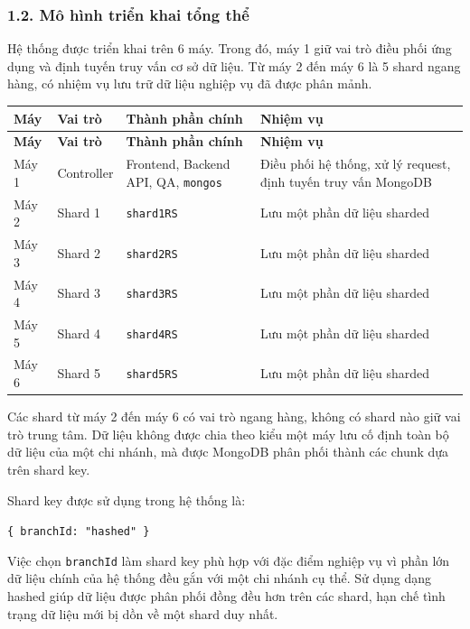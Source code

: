 \documentclass[12pt,a4paper]{article}
\begin{document}
\subsubsection*{1.2. Mô hình triển khai tổng thể}

Hệ thống được triển khai trên 6 máy. Trong đó, máy 1 giữ vai trò điều phối ứng dụng và định tuyến truy vấn cơ sở dữ liệu. Từ máy 2 đến máy 6 là 5 shard ngang hàng, có nhiệm vụ lưu trữ dữ liệu nghiệp vụ đã được phân mảnh.

\begin{center}
\small
\begin{longtable}{|p{1.4cm}|p{2.1cm}|p{3.8cm}|p{6cm}|}
\hline
\textbf{Máy} & \textbf{Vai trò} & \textbf{Thành phần chính} & \textbf{Nhiệm vụ} \\ \hline
\endfirsthead
\hline
\textbf{Máy} & \textbf{Vai trò} & \textbf{Thành phần chính} & \textbf{Nhiệm vụ} \\ \hline
\endhead
Máy 1 & Controller & Frontend, Backend API, QA, \texttt{mongos} & Điều phối hệ thống, xử lý request, định tuyến truy vấn MongoDB \\ \hline
Máy 2 & Shard 1 & \texttt{shard1RS} & Lưu một phần dữ liệu sharded \\ \hline
Máy 3 & Shard 2 & \texttt{shard2RS} & Lưu một phần dữ liệu sharded \\ \hline
Máy 4 & Shard 3 & \texttt{shard3RS} & Lưu một phần dữ liệu sharded \\ \hline
Máy 5 & Shard 4 & \texttt{shard4RS} & Lưu một phần dữ liệu sharded \\ \hline
Máy 6 & Shard 5 & \texttt{shard5RS} & Lưu một phần dữ liệu sharded \\ \hline
\end{longtable}
\normalsize
\end{center}

Các shard từ máy 2 đến máy 6 có vai trò ngang hàng, không có shard nào giữ vai trò trung tâm. Dữ liệu không được chia theo kiểu một máy lưu cố định toàn bộ dữ liệu của một chi nhánh, mà được MongoDB phân phối thành các chunk dựa trên shard key.

Shard key được sử dụng trong hệ thống là:

\begin{center}
\texttt{\{ branchId: "hashed" \}}
\end{center}

Việc chọn \texttt{branchId} làm shard key phù hợp với đặc điểm nghiệp vụ vì phần lớn dữ liệu chính của hệ thống đều gắn với một chi nhánh cụ thể. Sử dụng dạng hashed giúp dữ liệu được phân phối đồng đều hơn trên các shard, hạn chế tình trạng dữ liệu mới bị dồn về một shard duy nhất.
\end{document}
